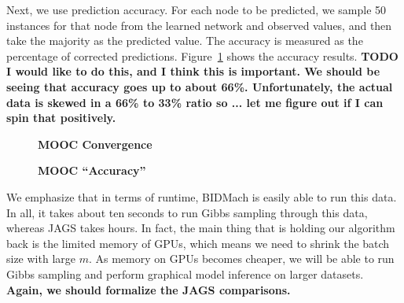 \documentclass{article} %
\begin{document}

Next, we use prediction accuracy. For each node to be predicted, we sample 50 instances for that
node from the learned network and observed values, and then take the majority as the predicted
value. The accuracy is measured as the percentage of corrected predictions.
Figure~\ref{fig:mooc_accuracy} shows the accuracy results.  \textbf{TODO I would like to do this,
and I think this is important. We should be seeing that accuracy goes up to about 66\%.
Unfortunately, the actual data is skewed in a 66\% to 33\% ratio so ... let me figure out if I can
spin that positively.}

\begin{figure}[t]
  \centering
  \begin{minipage}{.5\textwidth}
    \centering
    \fbox{\rule[-.5cm]{0cm}{4cm} \rule[-.5cm]{4cm}{0cm}}
    \caption{\textbf{MOOC Convergence}}
    \label{fig:mooc_cpts}
  \end{minipage}\hfill
    \begin{minipage}{.5\textwidth}
    \centering
    \fbox{\rule[-.5cm]{0cm}{4cm} \rule[-.5cm]{4cm}{0cm}}
    \caption{\textbf{MOOC ``Accuracy''}}
    \label{fig:mooc_accuracy}
  \end{minipage}
\end{figure}

We emphasize that in terms of runtime, BIDMach is easily able to run this data. In all, it takes
about ten seconds to run Gibbs sampling through this data, whereas JAGS takes hours. In fact, the
main thing that is holding our algorithm back is the limited memory of GPUs, which means we need to
shrink the batch size with large $m$. As memory on GPUs becomes cheaper, we will be able to run
Gibbs sampling and perform graphical model inference on larger datasets. \textbf{Again, we should
formalize the JAGS comparisons.}
\end{document}
